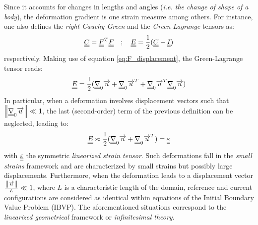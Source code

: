 Since it accounts for changes in lengths and angles (\textit{i.e. the change of shape of a body}), the deformation gradient is one strain measure among others. For instance, one also defines the \textit{right Cauchy-Green} and the \textit{Green-Lagrange} tensors as:
\begin{equation*}
  {\underline{\underline{C}}}={\underline{\underline{F}}}^T{\underline{\underline{F}}} \quad ; \quad {\underline{\underline{E}}}=\frac{1}{2}({\underline{\underline{C}}}-{\underline{\underline{I}}})
\end{equation*}
respectively. Making use of equation \eqref{eq:F_displacement}, the Green-Lagrange tensor reads:
\begin{equation*}
  {\underline{\underline{E}}}=\frac{1}{2}({\underline{\underline{\nabla}}}_0 {\overrightarrow{u}} + {\underline{\underline{\nabla}}}_0 {\overrightarrow{u}}^T + {\underline{\underline{\nabla}}}_0 {\overrightarrow{u}}^T {\underline{\underline{\nabla}}}_0 {\overrightarrow{u}})
\end{equation*}
In particular, when a deformation involves displacement vectors such that $\left\Vert{\underline{\underline{\nabla}}}_0 {\overrightarrow{u}}\right\Vert \ll 1$, the last (second-order) term of the previous definition can be neglected, leading to:
\begin{equation}
  \label{eq:epsilon}
  {\underline{\underline{E}}} \approx \frac{1}{2}({\underline{\underline{\nabla}}}_0 {\overrightarrow{u}} + {\underline{\underline{\nabla}}}_0 {\overrightarrow{u}}^T) = {\underline{\underline{\varepsilon}}}
\end{equation}
with ${\underline{\underline{\varepsilon}}}$ the symmetric \textit{linearized strain tensor}. Such deformations fall in the \textit{small strains} framework and are characterized by small strains but possibly large displacements. Furthermore, when the deformation leads to a displacement vector $\frac{\left\Vert{\overrightarrow{u}}\right\Vert}{L} \ll 1$, where $L$ is a characteristic length of the domain, reference and current configurations are considered as identical within equations of the Initial Boundary Value Problem (IBVP). The aforementioned situations correspond to the \textit{linearized geometrical} framework  or \textit{infinitesimal theory}.

